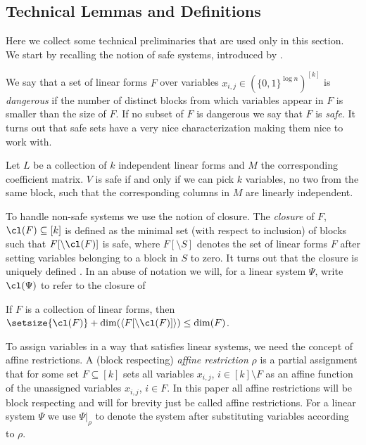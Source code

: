 \subsection{Technical Lemmas and Definitions}

Here we collect some technical preliminaries that are used only in this section. We start by recalling the notion of safe systems, introduced by \cite{EGI24regular}. 

We say that a set of linear forms $F$ over variables $x_{i,j} \in ({\{0,1\}}^{\log n})^{[k]}$ is \emph{dangerous} if the number of distinct blocks from which variables appear in $F$ is smaller than the size of $F$. If no subset of $F$ is dangerous we say that $F$ is \emph{safe}. It turns out that safe sets have a very nice characterization making them nice to work with.

\begin{lemma}
\label{lemma:safeSystem-charactarisation}
Let $L$ be a collection of $k$ independent linear forms and $M$ the corresponding coefficient matrix. $V$ is safe if and only if we can pick $k$ variables, no two from the same block, such that the corresponding columns in $M$ are linearly independent.
\end{lemma} 

To handle non-safe systems we use the notion of closure. The \emph{closure} of $F$, $\cl(F) \subseteq [k]$ is defined as the minimal set (with respect to inclusion) of blocks such that $F[\setminus \cl(F)]$ is safe, where $F[\setminus S]$ denotes the set of linear forms $F$ after setting variables belonging to a block in $S$ to zero. It turns out that the closure is uniquely defined \cite[Lemma 4.1]{EGI24regular}. In an abuse of notation we will, for a linear system $\Psi$, write $\cl(\Psi)$ to refer to the closure of 

\begin{lemma}
\label{lemma:safe-dimension-bound} If $F$ is a collection of linear forms, then $\setsize{\cl(F)} + \mathrm{dim}(\langle F[\setminus\cl(F)]\rangle) \leq
\mathrm{dim}(F)$.
\end{lemma}

To assign variables in a way that satisfies linear systems, we need the concept of affine restrictions. A (block respecting) \emph{affine restriction} $\rho$ is a partial assignment that for some set $F\subseteq [k]$ sets all variables $x_{i,j}$, $i\in [k]\setminus F$ as an affine function of the unassigned variables $x_{i,j}$, $i\in F$. In this paper all affine restrictions will be block respecting and will for brevity just be called affine restrictions. For a linear system $\Psi$ we use $\Psi|_\rho$ to denote the system after substituting variables according to $\rho$.


